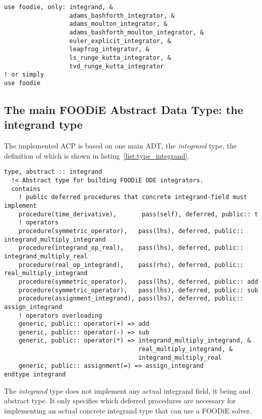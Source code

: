 \documentclass[pdftex,preprint,3p,times,numbers]{elsarticle}
\begin{document}
\begin{lstlisting}[firstnumber=1,style=code,caption={usage example importing all public entities of FOODiE main module},label={list:main_module}]
use foodie, only: integrand, &
                  adams_bashforth_integrator, &
                  adams_moulton_integrator, &
                  adams_bashforth_moulton_integrator, &
                  euler_explicit_integrator, &
                  leapfrog_integrator, &
                  ls_runge_kutta_integrator, &
                  tvd_runge_kutta_integrator
! or simply
use foodie
\end{lstlisting}

\subsection{The main FOODiE Abstract Data Type: the integrand type}\label{subsec:type_integrand}

The implemented ACP is based on one main ADT, the \emph{integrand} type, the definition of which is shown in listing~\ref{list:type_integrand}.

\begin{lstlisting}[firstnumber=1,style=code,caption={integrand type definition},label={list:type_integrand}]
type, abstract :: integrand
  !< Abstract type for building FOODiE ODE integrators.
  contains
    ! public deferred procedures that concrete integrand-field must implement
    procedure(time_derivative),       pass(self), deferred, public:: t
    ! operators
    procedure(symmetric_operator),   pass(lhs), deferred, public:: integrand_multiply_integrand
    procedure(integrand_op_real),    pass(lhs), deferred, public:: integrand_multiply_real
    procedure(real_op_integrand),    pass(rhs), deferred, public:: real_multiply_integrand
    procedure(symmetric_operator),   pass(lhs), deferred, public:: add
    procedure(symmetric_operator),   pass(lhs), deferred, public:: sub
    procedure(assignment_integrand), pass(lhs), deferred, public:: assign_integrand
    ! operators overloading
    generic, public:: operator(+) => add
    generic, public:: operator(-) => sub
    generic, public:: operator(*) => integrand_multiply_integrand, &
                                     real_multiply_integrand, &
                                     integrand_multiply_real
    generic, public:: assignment(=) => assign_integrand
endtype integrand
\end{lstlisting}

The \emph{integrand} type does not implement any actual integrand field, it being and abstract type. It only specifies which deferred procedures are necessary for implementing an actual concrete integrand type that can use a FOODiE solver.
\end{document}
